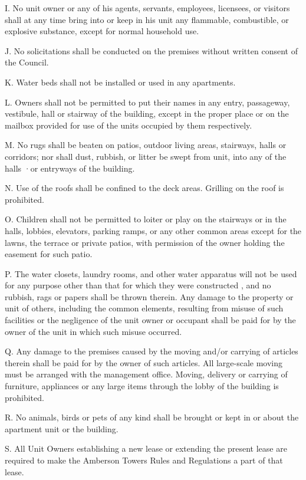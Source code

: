 \documentclass[
]{book}
\begin{document}
I. No unit owner or any of his agents, servants, employees, licensees, or visitors shall at any time bring into or keep in his unit any flammable, combustible, or explosive substance, except for normal household use.

J. No solicitations shall be conducted on the premises without written consent of the Council.

K. Water beds shall not be installed or used in any apartments.

L. Owners shall not be permitted to put their names in any entry, passageway, vestibule, hall or stairway of the building, except in the proper place or on the mailbox provided for use of the units occupied by them respectively.

M. No rugs shall be beaten on patios, outdoor living areas, stairways, halls or corridors; nor shall dust, rubbish, or litter be swept from unit, into any of the halls ·or entryways of the building.

N. Use of the roofs shall be confined to the deck areas. Grilling on the roof is prohibited.

O. Children shall not be permitted to loiter or play on the stairways or in the halls, lobbies, elevators, parking ramps, or any other common areas except for the lawns, the terrace or private patios, with permission of the owner holding the easement for such patio.

P. The water closets, laundry rooms, and other water apparatus will not be used for any purpose other than that for which they were constructed , and no rubbish, rags or papers shall be thrown therein. Any damage to the property or unit of others, including the common elements, resulting from misuse of such facilities or the negligence of the unit owner or occupant shall be paid for by the owner of the unit in which such misuse occurred.

Q. Any damage to the premises caused by the moving and/or carrying of articles therein shall be paid for by the owner of such articles. All large-scale moving must be arranged with the management office. Moving, delivery or carrying of furniture, appliances or any large items through the lobby of the building is prohibited.

R. No animals, birds or pets of any kind shall be brought or kept in or about the apartment unit or the building.

S. All Unit Owners establishing a new lease or extending the present lease are required to make the Amberson Towers Rules and Regulations a part of that lease.
\end{document}
